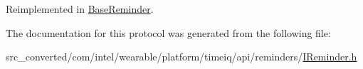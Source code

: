 Reimplemented in \hyperlink{interface_base_reminder_a82ce33dce05cbc5ea950c3de86b30822}{Base\+Reminder}.



The documentation for this protocol was generated from the following file\+:\begin{DoxyCompactItemize}
\item 
src\+\_\+converted/com/intel/wearable/platform/timeiq/api/reminders/\hyperlink{_i_reminder_8h}{I\+Reminder.\+h}\end{DoxyCompactItemize}
